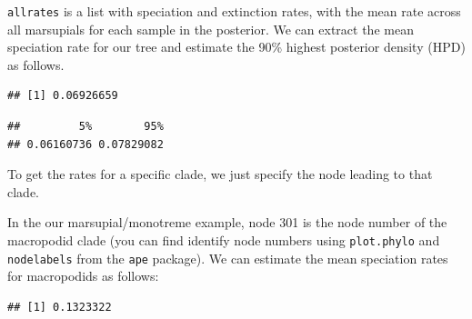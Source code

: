 \documentclass[]{book}
\newenvironment{Shaded}{\begin{snugshade}}{\end{snugshade}}
\newcommand{\KeywordTok}[1]{\textcolor[rgb]{0.13,0.29,0.53}{\textbf{{#1}}}}
\newcommand{\DataTypeTok}[1]{\textcolor[rgb]{0.13,0.29,0.53}{{#1}}}
\newcommand{\DecValTok}[1]{\textcolor[rgb]{0.00,0.00,0.81}{{#1}}}
\newcommand{\FloatTok}[1]{\textcolor[rgb]{0.00,0.00,0.81}{{#1}}}
\newcommand{\StringTok}[1]{\textcolor[rgb]{0.31,0.60,0.02}{{#1}}}
\newcommand{\NormalTok}[1]{{#1}}
\begin{document}
\texttt{allrates} is a list with speciation and extinction rates, with
the mean rate across all marsupials for each sample in the posterior. We
can extract the mean speciation rate for our tree and estimate the 90\%
highest posterior density (HPD) as follows.

\begin{Shaded}
\end{Shaded}

\begin{verbatim}
## [1] 0.06926659
\end{verbatim}

\begin{Shaded}
\end{Shaded}

\begin{verbatim}
##         5%        95% 
## 0.06160736 0.07829082
\end{verbatim}

To get the rates for a specific clade, we just specify the node leading
to that clade.

In the our marsupial/monotreme example, node 301 is the node number of
the macropodid clade (you can find identify node numbers using
\texttt{plot.phylo} and \texttt{nodelabels} from the \texttt{ape}
package). We can estimate the mean speciation rates for macropodids as
follows:

\begin{Shaded}
\end{Shaded}

\begin{verbatim}
## [1] 0.1323322
\end{verbatim}

\begin{Shaded}
\end{Shaded}
\end{document}

